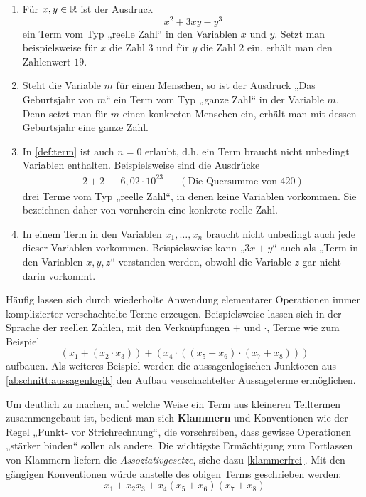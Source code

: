 \begin{bsp} \label{bsp:term} \quad
    \begin{enumerate}
        \item Für $x,y\in \mathbb R$ ist der Ausdruck
            \[ x^2+3xy-y^3 \]
        ein Term vom Typ „reelle Zahl“ in den Variablen $x$ und $y$. Setzt man beispielsweise für $x$ die Zahl $3$ und für $y$ die Zahl $2$ ein, erhält man den Zahlenwert $19$.
        \item Steht die Variable $m$ für einen Menschen, so ist der Ausdruck „Das Geburtsjahr von $m$“ ein Term vom Typ „ganze Zahl“ in der Variable $m$. Denn setzt man für $m$ einen konkreten Menschen ein, erhält man mit dessen Geburtsjahr eine ganze Zahl.
        \item In \cref{def:term} ist auch $n=0$ erlaubt, d.h. ein Term braucht nicht unbedingt Variablen enthalten. Beispielsweise sind die Ausdrücke
        \begin{align*}
             2+2 && 6{,}02\cdot 10^{23} && (\text{Die Quersumme von $420$})
        \end{align*}
        drei Terme vom Typ „reelle Zahl“, in denen keine Variablen vorkommen. Sie bezeichnen daher von vornherein eine konkrete reelle Zahl.
        \item In einem Term in den Variablen $x_1,\dots , x_n$ braucht nicht unbedingt auch jede dieser Variablen vorkommen. Beispielsweise kann „$3x+y$“ auch als „Term in den Variablen $x,y,z$“ verstanden werden, obwohl die Variable $z$ gar nicht darin vorkommt.
    \end{enumerate}
\end{bsp}


\begin{nota}[Klammersetzung] \label{klammern}
    Häufig lassen sich durch wiederholte Anwendung elementarer Operationen immer komplizierter verschachtelte Terme erzeugen. Beispielsweise lassen sich in der Sprache der reellen Zahlen, mit den Verknüpfungen $+$ und $\cdot$, Terme wie zum Beispiel
        \[ (x_1 +(x_2\cdot x_3))+(x_4\cdot ((x_5+x_6)\cdot (x_7+x_8)))\]
    aufbauen. Als weiteres Beispiel werden die aussagenlogischen Junktoren aus \cref{abschnitt:aussagenlogik} den Aufbau verschachtelter Aussageterme ermöglichen.

    Um deutlich zu machen, auf welche Weise ein Term aus kleineren Teiltermen zusammengebaut ist, bedient man sich \textbf{Klammern} und Konventionen wie der Regel „Punkt- vor Strichrechnung“, die vorschreiben, dass gewisse Operationen „stärker binden“ sollen als andere. Die wichtigste Ermächtigung zum Fortlassen von Klammern liefern die \emph{Assoziativgesetze}, siehe dazu \cref{klammerfrei}. Mit den gängigen Konventionen würde anstelle des obigen Terms geschrieben werden:
        \[ x_1 + x_2x_3+x_4(x_5+x_6)(x_7+x_8)\]
\end{nota}


